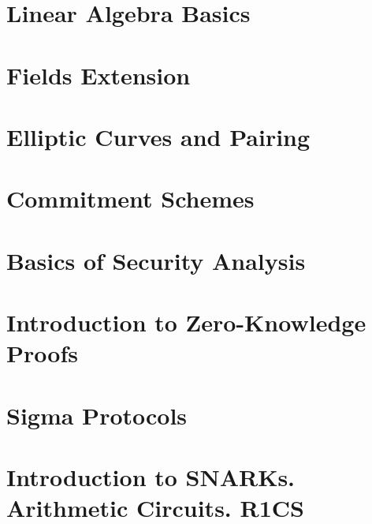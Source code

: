 \documentclass{zkdl-template}
\begin{document}
    \section{Linear Algebra Basics}\label{section:linear-algebra}
    

    \section{Fields Extension}\label{section:finite-fields}
    

    \section{Elliptic Curves and Pairing}\label{section:elliptic-curves}
    

    \section{Commitment Schemes}\label{section:commitment-schemes}
    

    \section{Basics of Security Analysis}\label{section:security-analysis}
    


    \section{Introduction to Zero-Knowledge Proofs}\label{section:intro-zk}
    

    \section{Sigma Protocols}\label{section:sigma}
    

    \section[Arithmetic Circuits. R1CS]{Introduction to SNARKs. Arithmetic Circuits. R1CS} \label{section:r1cs}
    \label{section:circuits}
\end{document}
